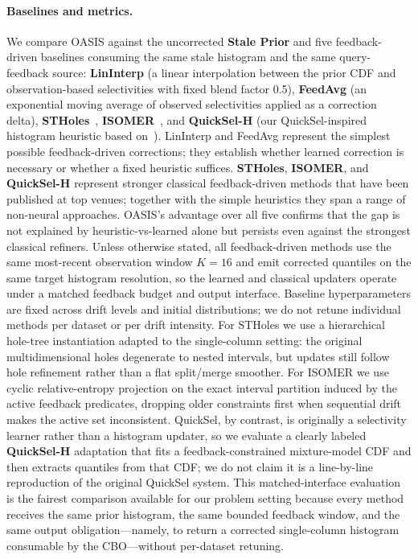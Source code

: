 \documentclass[runningheads]{llncs}
\begin{document}
\paragraph{Baselines and metrics.}
We compare OASIS against the uncorrected \textbf{Stale Prior} and five
feedback-driven baselines consuming the same stale histogram and the same query-feedback source:
\textbf{LinInterp} (a linear interpolation between the prior CDF and observation-based selectivities with fixed blend factor 0.5),
\textbf{FeedAvg} (an exponential moving average of observed selectivities applied as a correction delta),
\textbf{STHoles}~\cite{bruno2001stholes}, \textbf{ISOMER}~\cite{markl2007consistent},
and \textbf{QuickSel-H} (our QuickSel-inspired histogram heuristic based on~\cite{park2020quicksel}).
LinInterp and FeedAvg represent the simplest possible feedback-driven corrections;
they establish whether learned correction is necessary or whether a fixed heuristic suffices.
\textbf{STHoles}, \textbf{ISOMER}, and \textbf{QuickSel-H} represent stronger classical feedback-driven methods that have been published at top venues; together with the simple heuristics they span a range of non-neural approaches. OASIS's advantage over all five confirms that the gap is not explained by heuristic-vs-learned alone but persists even against the strongest classical refiners.
Unless otherwise stated, all feedback-driven methods use the same most-recent observation window $K{=}16$ and emit corrected quantiles on the same target histogram resolution, so the learned and classical updaters operate under a matched feedback budget and output interface. Baseline hyperparameters are fixed across drift levels and initial distributions; we do not retune individual methods per dataset or per drift intensity.
For STHoles we use a hierarchical hole-tree instantiation adapted to the
single-column setting: the original multidimensional holes degenerate to nested
intervals, but updates still follow hole refinement rather than a flat
split/merge smoother. For ISOMER we use cyclic relative-entropy projection on
the exact interval partition induced by the active feedback predicates, dropping
older constraints first when sequential drift makes the active set inconsistent.
QuickSel, by contrast, is originally a selectivity learner rather than a
histogram updater, so we evaluate a clearly labeled \textbf{QuickSel-H}
adaptation that fits a feedback-constrained mixture-model CDF and then extracts
quantiles from that CDF; we do not claim it is a line-by-line reproduction of
the original QuickSel system. This matched-interface evaluation is the fairest
comparison available for our problem setting because every method receives the
same prior histogram, the same bounded feedback window, and the same output
obligation---namely, to return a corrected single-column histogram consumable by
the CBO---without per-dataset retuning.
\end{document}
